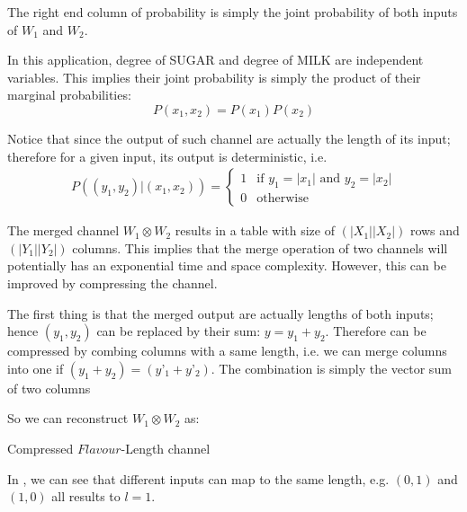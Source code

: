 \begin{example}
The right end column of probability is simply the joint probability of both inputs of $W_1$ and $W_2$. 

In this application, degree of SUGAR and degree of MILK are independent variables. This implies their joint probability is simply the product of their marginal probabilities:
\begin{equation}
P(x_1, x_2) = P(x_1) P(x_2)
\end{equation}

Notice that since the output of such channel are actually the length of its input; therefore for a given input, its output is deterministic, i.e.
\begin{eqnarray} 
P((y_1,y_2)|(x_1,x_2)) =
	\begin{cases}
	1 &\text{if } y_1 = |x_1| \text{ and } y_2 = |x_2| \\
	0 &\text{otherwise}
	\end{cases}
\label{Eq: Length Probability}
\end{eqnarray}

The merged channel $W_1 \otimes W_2$ results in a table with size of $(|X_1||X_2|)$ rows and $(|Y_1| |Y_2|)$ columns. This implies that the merge operation of two channels will potentially has an exponential time and space complexity. However, this can be improved by compressing the channel.

The first thing is that the merged output are actually lengths of both inputs; hence $(y_1, y_2)$ can be replaced by their sum: $y = y_1 + y_2$. Therefore  can be compressed by combing columns with a same length, i.e. we can merge columns into one if $(y_1 + y_2) = (y’_1 + y’_2)$. The combination is simply the vector sum of two columns

So we can reconstruct $W_1 \otimes W_2$ as:
\begin{table}[H]
\begin{center}
{}
\end{center}
\caption{Compressed $Flavour$-Length channel}
\label{Tbl: Compressed Flavour}
\end{table}

In , we can see that different inputs can map to the same length, e.g. $(0,1)$ and $(1,0)$ all results to $l = 1$.


\end{example}
